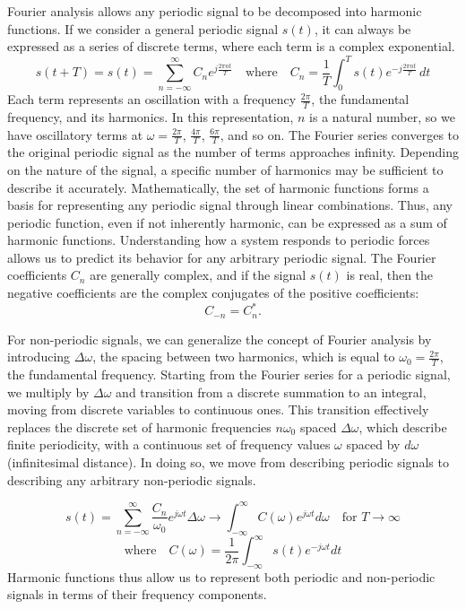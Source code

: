 \documentclass[a4paper]{article}
\begin{document}
Fourier analysis allows any periodic signal to be decomposed into harmonic functions. If we consider a general periodic signal \( s(t) \), it can always be expressed as a series of discrete terms, where each term is a complex exponential. 
\[
s(t + T) = s(t) = \sum_{n=-\infty}^\infty C_n e^{j\frac{2\pi n t}{T}} \quad \text{where} \quad C_n = \frac{1}{T} \int_0^T s(t) e^{-j\frac{2\pi n t}{T}} \, dt
\]
Each term represents an oscillation with a frequency \( \frac{2\pi}{T} \), the fundamental frequency, and its harmonics. In this representation, \( n \) is a natural number, so we have oscillatory terms at \( \omega = \frac{2\pi}{T} \), \( \frac{4\pi}{T} \), \( \frac{6\pi}{T} \), and so on. The Fourier series converges to the original periodic signal as the number of terms approaches infinity. Depending on the nature of the signal, a specific number of harmonics may be sufficient to describe it accurately. Mathematically, the set of harmonic functions forms a basis for representing any periodic signal through linear combinations. Thus, any periodic function, even if not inherently harmonic, can be expressed as a sum of harmonic functions.
Understanding how a system responds to periodic forces allows us to predict its behavior for any arbitrary periodic signal. The Fourier coefficients \( C_n \) are generally complex, and if the signal \( s(t) \) is real, then the negative coefficients are the complex conjugates of the positive coefficients:
\[
C_{-n} = C_n^*.
\]


For non-periodic signals, we can generalize the concept of Fourier analysis by introducing \( \Delta \omega \), the spacing between two harmonics, which is equal to \( \omega_0 = \frac{2\pi}{T} \), the fundamental frequency. Starting from the Fourier series for a periodic signal, we multiply by \( \Delta \omega \) and transition from a discrete summation to an integral, moving from discrete variables to continuous ones. This transition effectively replaces the discrete set of harmonic frequencies \( n\omega_0 \) spaced \( \Delta \omega \), which describe finite periodicity, with a continuous set of frequency values \( \omega \) spaced by \( d\omega \) (infinitesimal distance). In doing so, we move from describing periodic signals to describing any arbitrary non-periodic signals.

\[
s(t) = \sum_{n=-\infty}^\infty \frac{C_n}{\omega_0} e^{j\omega t} \Delta \omega \to \int_{-\infty}^\infty C(\omega) e^{j\omega t} d\omega \quad \text{for } T \to \infty \]
\[ \text{where}  \quad
C(\omega) = \frac{1}{2\pi} \int_{-\infty}^\infty s(t) e^{-j\omega t} dt
\]
Harmonic functions thus allow us to represent both periodic and non-periodic signals in terms of their frequency components.
\end{document}
